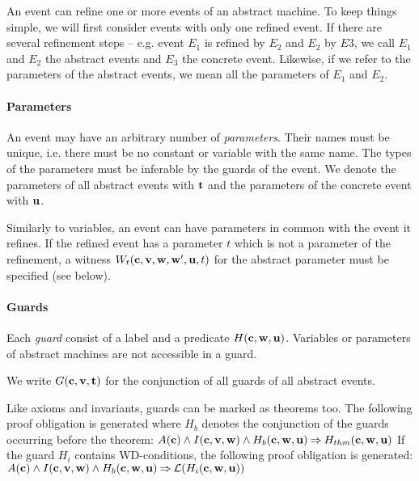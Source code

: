 An event can refine one or more events of an abstract machine. To keep things simple, we will
  first consider events with only one refined event.
If there are several refinement steps -- e.g. event $E_1$ is refined by $E_2$ and $E_2$ by
  $E3$, we call $E_1$ and $E_2$ the abstract events and $E_3$ the concrete event.
Likewise, if we refer to the parameters of the abstract events, we mean all the parameters
  of $E_1$ and $E_2$.

\paragraph{Parameters}
An event may have an arbitrary number of \emph{parameters}. Their names must be unique, i.e. there must be no constant or variable with the same name.
The types of the parameters must be inferable by the guards of the event.
We denote the parameters of all abstract events with $\mathbf{t}$ and the
parameters of the concrete event with $\mathbf{u}$.

Similarly to variables, an event can have parameters in common with the event it refines.
If the refined event has a parameter $t$ which is not a parameter of the refinement, 
 a witness $W_t(\mathbf{c},{\mathbf{v},\mathbf{w}},\mathbf{w}',\mathbf{u},t)$ for
 the abstract parameter must be specified (see below).

\paragraph{Guards}
\label{guards}
Each \emph{guard} consist of a label and a predicate $H(\mathbf{c},\mathbf{w},\mathbf{u})$.
Variables or parameters of abstract machines are not accessible in a guard.

We write $G(\mathbf{c},\mathbf{v},\mathbf{t})$ for the conjunction of all guards of all abstract events.

Like axioms and invariants, guards can be marked as theorems too. The following
proof obligation is generated where $H_b$ denotes the conjunction of the guards occurring before the theorem:
%
{$A(\mathbf{c}) \land I(\mathbf{c},\mathbf{v},\mathbf{w}) \land H_b(\mathbf{c},\mathbf{w},\mathbf{u}) 
\mathbin\Rightarrow H_{thm}(\mathbf{c},\mathbf{w},\mathbf{u})$}
If the guard $H_i$ contains WD-conditions, the following proof obligation is generated:
%
{$A(\mathbf{c}) \land I(\mathbf{c},\mathbf{v},\mathbf{w}) \land H_b(\mathbf{c},\mathbf{w},\mathbf{u}) 
\mathbin\Rightarrow \mathcal{L}(H_i(\mathbf{c},\mathbf{w},\mathbf{u}))$}



